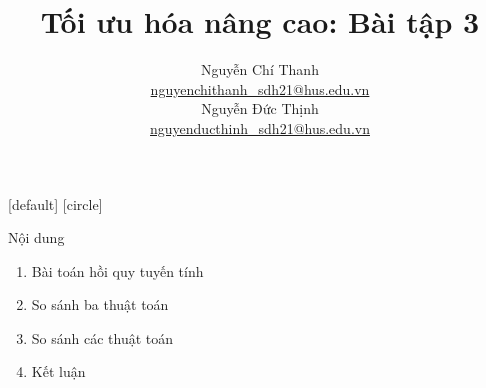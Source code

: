 \documentclass[10pt]{beamer}
\title[Tối ưu hóa nâng cao]{Tối ưu hóa nâng cao: Bài tập 3}
\theoremstyle{remark}
\theoremstyle{definition}
\begin{document}
\nocite{*}

\author[Nguyễn Chí Thanh - Nguyễn Đức Thịnh]{
	\begin{tabular}{c} 
	\Large
	Nguyễn Chí Thanh \\
    \footnotesize \href{mailto:nguyenchithanh\_sdh21@hus.edu.vn}{nguyenchithanh\_sdh21@hus.edu.vn} \\
	\Large
    Nguyễn Đức Thịnh \\
     \footnotesize \href{mailto:nguyenducthinh\_sdh21@hus.edu.vn}{nguyenducthinh\_sdh21@hus.edu.vn}
\end{tabular}
\vspace{-4ex}}


\begin{noheadline}
\begin{frame} \maketitle \end{frame}
\end{noheadline}
    
[default]
[circle]

\begin{frame}{Nội dung}

    \begin{enumerate}
		\item Bài toán hồi quy tuyến tính
        \item So sánh ba thuật toán
        \item So sánh các thuật toán
        \item Kết luận
    \end{enumerate}
    
\end{frame}
\end{document}
